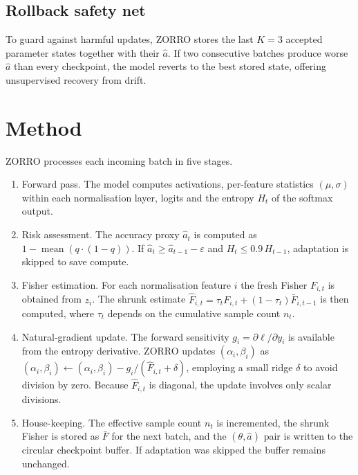 \documentclass{article} %
\begin{document}
\subsection{Rollback safety net}
To guard against harmful updates, ZORRO stores the last \(K = 3\) accepted parameter states together with their \(\hat{a}\). If two consecutive batches produce worse \(\hat{a}\) than every checkpoint, the model reverts to the best stored state, offering unsupervised recovery from drift.

\section{Method}
\label{sec:method}%
ZORRO processes each incoming batch in five stages.
\begin{enumerate}
\item Forward pass. The model computes activations, per-feature statistics \((\mu, \sigma)\) within each normalisation layer, logits and the entropy \(H_t\) of the softmax output.
\item Risk assessment. The accuracy proxy \(\hat{a}_t\) is computed as \(1 - \operatorname{mean}(q\cdot(1 - q))\). If \(\hat{a}_t \ge \hat{a}_{t-1} - \varepsilon\) and \(H_t \le 0.9\, H_{t-1}\), adaptation is skipped to save compute.
\item Fisher estimation. For each normalisation feature \(i\) the fresh Fisher \(F_{i,t}\) is obtained from \(z_i\). The shrunk estimate \(\hat{F}_{i,t} = \tau_t F_{i,t} + (1 - \tau_t)\bar{F}_{i,t-1}\) is then computed, where \(\tau_t\) depends on the cumulative sample count \(n_t\).
\item Natural-gradient update. The forward sensitivity \(g_i = \partial \ell/\partial y_i\) is available from the entropy derivative. ZORRO updates \((\alpha_i, \beta_i)\) as
\( (\alpha_i, \beta_i) \leftarrow (\alpha_i, \beta_i) - g_i / (\hat{F}_{i,t} + \delta) \), employing a small ridge \(\delta\) to avoid division by zero. Because \(\hat{F}_{i,t}\) is diagonal, the update involves only scalar divisions.
\item House-keeping. The effective sample count \(n_t\) is incremented, the shrunk Fisher is stored as \(\bar{F}\) for the next batch, and the \((\theta, \hat{a})\) pair is written to the circular checkpoint buffer. If adaptation was skipped the buffer remains unchanged.
\end{enumerate}
\end{document}
